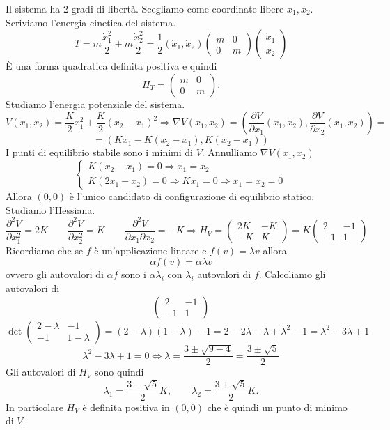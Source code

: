 \begin{example}{}
Il sistema ha 2 gradi di libertà. Scegliamo come coordinate libere \(x_1,x_2\). Scriviamo l'energia cinetica del sistema.
\[
T = m\frac{\dot{x}_1^2}{2} + m\frac{\dot{x}_2^2}{2}
=
\frac{1}{2}
(\dot{x}_1,\dot{x}_2)
\begin{pmatrix}
m & 0\\
0 & m
\end{pmatrix}
\begin{pmatrix}
\dot{x}_1\\
\dot{x}_2
\end{pmatrix}
\]
È una forma quadratica definita positiva e quindi
\[
H_T=
\begin{pmatrix}
m & 0\\
0 & m
\end{pmatrix}.
\]
Studiamo l'energia potenziale del sistema.
\[
V(x_1,x_2)=\frac{K}{2}x_1^2+\frac{K}{2}(x_2-x_1)^2
\Rightarrow
\nabla V(x_1,x_2)=
\left(
\frac{\partial V}{\partial x_1}(x_1,x_2),
\frac{\partial V}{\partial x_2}(x_1,x_2)
\right)
=
\]
\[
=
\left(
Kx_1-K(x_2-x_1),K(x_2-x_1)
\right)
\]
I punti di equilibrio stabile sono i minimi di \(V\). Annulliamo \(\nabla V(x_1,x_2)\)
\[
\begin{cases}
K(x_2-x_1)=0 \Rightarrow x_1=x_2\\
K(2x_1-x_2)=0 \Rightarrow Kx_1=0 \Rightarrow x_1=x_2=0
\end{cases}
\]
Allora \((0,0)\) è l'unico candidato di configurazione di equilibrio statico. Studiamo l'Hessiana.
\[
\frac{\partial^2 V}{\partial x_1^2}=2K
\qquad
\frac{\partial^2 V}{\partial x_2^2}=K
\qquad
\frac{\partial^2 V}{\partial x_1\partial x_2}=-K
\Rightarrow
H_V=
\begin{pmatrix}
2K & -K\\
-K & K
\end{pmatrix}
=
K
\begin{pmatrix}
2 & -1\\
-1 & 1
\end{pmatrix}
\]
Ricordiamo che se \(f\) è un'applicazione lineare e \(f(v)=\lambda v\) allora
\[
\alpha f(v)=\alpha \lambda v
\]
ovvero gli autovalori di \(\alpha f\) sono i \(\alpha \lambda_i\) con \(\lambda_i\) autovalori di \(f\). Calcoliamo gli autovalori di
\[
\begin{pmatrix}
2 & -1\\
-1 & 1
\end{pmatrix}
\]
\[
\det
\begin{pmatrix}
2-\lambda & -1\\
-1 & 1-\lambda
\end{pmatrix}
=
(2-\lambda)(1-\lambda)-1
=
2-2\lambda-\lambda+\lambda^2-1
=
\lambda^2-3\lambda+1
\]
\[
\lambda^2-3\lambda+1=0
\Leftrightarrow
\lambda=
\frac{3\pm\sqrt{9-4}}{2}
=
\frac{3\pm\sqrt{5}}{2}
\]
Gli autovalori di \(H_V\) sono quindi
\[
\lambda_1=\frac{3-\sqrt{5}}{2}K,
\qquad
\lambda_2=\frac{3+\sqrt{5}}{2}K.
\]
In particolare \(H_V\) è definita positiva in \((0,0)\) che è quindi un punto di minimo di \(V\).


\end{example}

